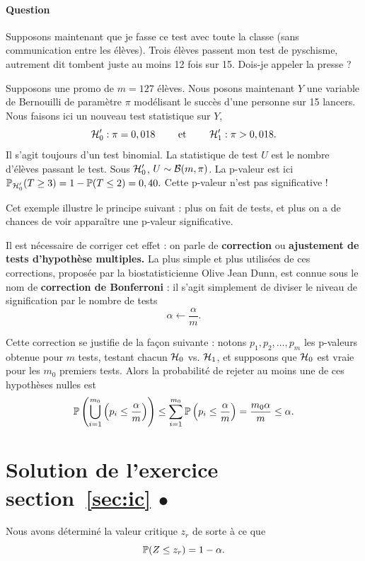\paragraph{Question} Supposons maintenant que je fasse ce test avec toute la
classe (sans communication entre les élèves). Trois élèves passent mon test de
pyschisme, autrement dit tombent juste au moins 12 fois sur 15. Dois-je appeler
la presse ?
\begin{answer}
  Supposons une promo de $m=127$ élèves. Nous posons maintenant $Y$ une
  variable de Bernouilli de paramètre $\pi$ modélisant le succès d'une personne
  sur 15 lancers. Nous faisons ici un nouveau test statistique sur $Y$,
  \[
    \mathcal{H}_0^\prime : \pi = 0,018 \text { \qquad et \qquad} \mathcal{H}_1^\prime : \pi >
    0,018.
  \]
  Il s'agit toujours d'un test binomial. La statistique de test $U$ est le
  nombre d'élèves passant le test. Sous $\mathcal{H}_0^\prime$, $U \sim \mathcal{B}(m,
  \pi)$.
  La p-valeur est ici
  $\mathbb{P}_{\mathcal{H}_0^\prime}(T \geq 3) = 1 - \mathbb{P}(T \leq 2) = 0,40.$ Cette p-valeur
  n'est pas significative !
\end{answer}

Cet exemple illustre le principe suivant : plus on fait de tests, et plus on a
de chances de voir apparaître une p-valeur significative. 

Il est nécessaire de corriger cet effet : on parle de \textbf{correction} ou
\textbf{ajustement de tests d'hypothèse multiples.} La plus simple et plus
utilisées de ces corrections, proposée par la biostatisticienne Olive Jean
Dunn, est connue sous le nom de \textbf{correction de Bonferroni} : il s'agit
simplement de diviser le niveau de signification par le nombre de tests
\[
  \alpha \leftarrow \frac{\alpha}{m}.
\]

Cette correction se justifie de la façon suivante : notons
$p_1, p_2, \dots, p_m$ les p-valeurs obtenue pour $m$ tests, testant chacun
$\mathcal{H}_0$ vs. $\mathcal{H}_1$, et supposons que $\mathcal{H}_0$ est vraie pour les $m_0$ premiers
tests. Alors la probabilité de rejeter au moins une de ces hypothèses nulles est
\[
  \mathbb{P}\left(\bigcup_{i=1}^{m_0} \left( p_i \leq \frac{\alpha}{m} \right)\right)  \leq
  \sum_{i=1}^{m_0} \mathbb{P} \left( p_i \leq \frac{\alpha}{m} \right)= \frac{m_0
    \alpha}{m} \leq \alpha.
\]



\section{Solution de l'exercice section~\ref{sec:ic} $\bullet$}
\label{sec:ic_sol}
Nous avons déterminé la valeur critique $z_r$ de sorte à ce que 
  \[
    \mathbb{P}(Z \leq z_r) = 1-\alpha.
  \]

